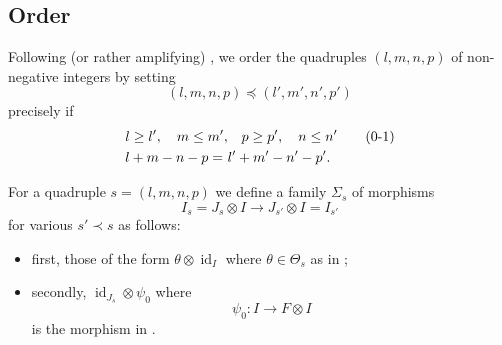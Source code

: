 \documentclass[11pt]{article}
\theoremstyle{plain}
\theoremstyle{nonumberplain}
\theoremstyle{plain}
\numberwithin{equation}{section}
\renewcommand{\theequation}{\thesection-\arabic{equation}}
\theoremstyle{nonumberplain}
\newcommand\bC{{\mathbb C}}
\newcommand\1{{\bf 1}}
\DeclareMathOperator{\id}{id}
\newcommand\numberthis{\addtocounter{equation}{1}\tag{\theequation}}
\begin{document}


\subsection{Order}\label{subse:ord}

Following (or rather amplifying) \cite{us0}, we order the quadruples $(l,m,n,p)$ of non-negative integers by setting
\begin{equation*}
  (l,m,n,p)\preceq (l',m',n',p')
\end{equation*}
precisely if
\begin{align*}
  l\ge l',\quad m\le m',&\quad p\ge p',\quad n\le n' \numberthis \label{eq:ord}\\
  l+m-n-p = \,\,& l'+m'-n'-p'.
\end{align*}

For a quadruple $s=(l,m,n,p)$ we define a family $\Sigma_s$ of morphisms
\begin{equation*}
  I_s=J_s\otimes I\to J_{s'}\otimes I=I_{s'}
\end{equation*}
for various $s'\prec s$ as follows:
\begin{itemize}
\item[$-$] first, those of the form $\theta\otimes\id_I$ where $\theta\in \Theta_s$ as in \cite[\S 3.2]{us0};
\item[$-$] secondly, $\id_{J_s}\otimes \psi_0$ where
  \begin{equation}\label{eq:16}
    \psi_0:I\to F\otimes I
  \end{equation}
  is the morphism in . 
\end{itemize}
\end{document}
